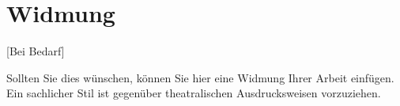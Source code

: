 \documentclass[Bachelorarbeit.tex]{subfiles}
\begin{document}
\chapter*{Widmung}
[Bei Bedarf]\par
%
Sollten Sie dies wünschen, können Sie hier eine Widmung Ihrer Arbeit einfügen. Ein sachlicher Stil ist gegenüber theatralischen Ausdrucksweisen vorzuziehen.
%
\end{document}
